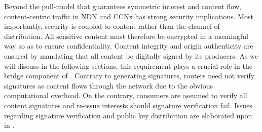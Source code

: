 Beyond the pull-model that guarantees symmetric interest and content flow, content-centric traffic in NDN and CCNx has strong security implications. Most importantly, security is coupled to content rather than the channel of distribution. All sensitive content must therefore be encrypted in a meaningful way so as to ensure confidentiality. Content integrity and origin authenticity are ensured by mandating that all content be digitally signed by its producers. As we will discuss in the following sections, this requirement plays a crucial role in the bridge component of \sink. Contrary to generating signatures, routers need not verify signatures as content flows through the network due to the obvious computational overhead. On the contrary, consumers are assumed to verify all content signatures and re-issue interests should signature verification fail. Issues regarding signature verification and public key distribution are elaborated upon in \cite{ghali2014elements}. 

